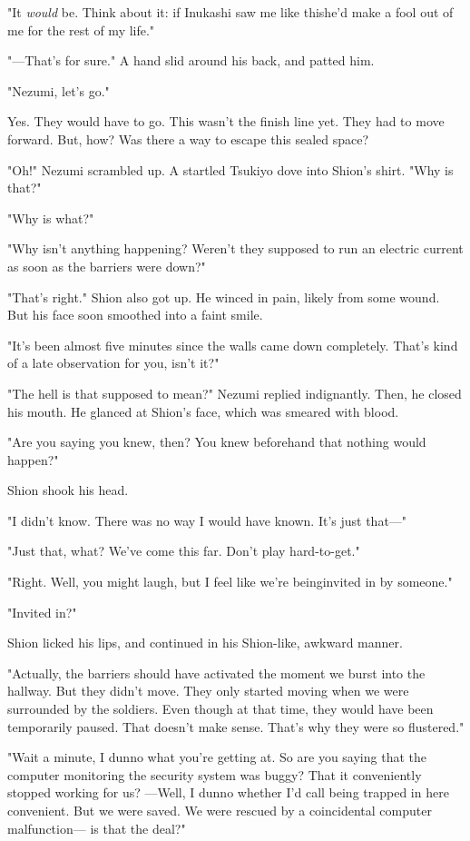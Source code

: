"It \emph{would} be. Think about it: if Inukashi saw me like this\el he'd make
a fool out of me for the rest of my life."

"---That's for sure." A hand slid around his back, and patted him.

"Nezumi, let's go."

Yes. They would have to go. This wasn't the finish line yet. They had to
move forward. But, how? Was there a way to escape this sealed space?

"Oh!" Nezumi scrambled up. A startled Tsukiyo dove into Shion's shirt.
"Why is that?"

"Why is what?"

"Why isn't anything happening? Weren't they supposed to run an electric
current as soon as the barriers were down?"

"That's right." Shion also got up. He winced in pain, likely from some
wound. But his face soon smoothed into a faint smile.

"It's been almost five minutes since the walls came down completely.
That's kind of a late observation for you, isn't it?"

"The hell is that supposed to mean?" Nezumi replied indignantly. Then,
he closed his mouth. He glanced at Shion's face, which was smeared with
blood.

"Are you saying you knew, then? You knew beforehand that nothing would
happen?"

Shion shook his head.

"I didn't know. There was no way I would have known. It's just that---"

"Just that, what? We've come this far. Don't play hard-to-get."

"Right. Well, you might laugh, but I feel like we're being\el invited in
by someone."

"Invited in?"

Shion licked his lips, and continued in his Shion-like, awkward manner.

"Actually, the barriers should have activated the moment we burst into
the hallway. But they didn't move. They only started moving when we were
surrounded by the soldiers. Even though at that time, they would have
been temporarily paused. That doesn't make sense. That's why they were
so flustered."

"Wait a minute, I dunno what you're getting at. So are you saying that
the computer monitoring the security system was buggy? That it
conveniently stopped working for us? ---Well, I dunno whether I'd call
being trapped in here convenient. But we were saved. We were rescued by
a coincidental computer malfunction--- is that the deal?"

